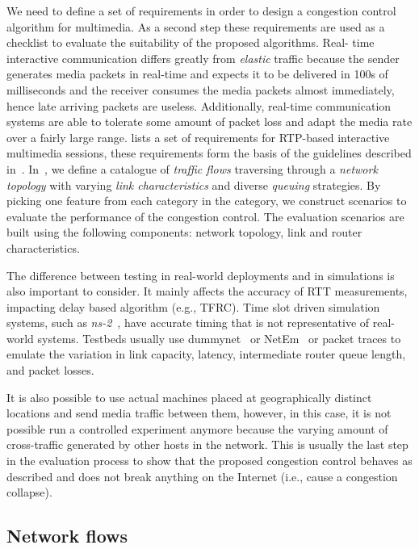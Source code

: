 We need to define a set of requirements in order to design a congestion
control algorithm for multimedia. As a second step these requirements are used
as a checklist to evaluate the suitability of the proposed algorithms. Real-
time interactive communication differs greatly from \emph{elastic} traffic
because the sender generates media packets in real-time and expects it to be
delivered in 100s of milliseconds and the receiver consumes the media packets
almost immediately, hence late arriving packets are useless. Additionally,
real-time communication systems are able to tolerate some amount of packet
loss and adapt the media rate over a fairly large range.
\cite{draft.rmcat.req} lists a set of requirements for RTP-based interactive
multimedia sessions, these requirements form the basis of the guidelines
described in~\cite{draft.rmcat.evaluate}. In~\cite{draft.rmcat.evaluate}, we
define a catalogue of \emph{traffic flows} traversing through a \emph{network
topology} with varying \emph{link characteristics} and diverse \emph{queuing}
strategies. By picking one feature from each category in the category, we
construct scenarios to evaluate the performance of the congestion control. The
evaluation scenarios are built using the following components: network
topology, link and router characteristics.

The difference between testing in real-world deployments and in simulations is
also important to consider. It mainly affects the accuracy of RTT
measurements, impacting delay based algorithm (e.g., TFRC). Time slot driven
simulation systems, such as \emph{ns-2}~\cite{ns2}, have accurate timing that
is not representative of real-world systems. Testbeds usually use
dummynet~\cite{Carbone:2010p3502} or NetEm~\cite{netem} or packet traces to
emulate the variation in link capacity, latency, intermediate router queue
length, and packet losses. 

It is also possible to use actual machines placed at geographically distinct
locations and send media traffic between them, however, in this case, it is
not possible run a controlled experiment anymore because the varying amount of
cross-traffic generated by other hosts in the network. This is usually the
last step in the evaluation process to show that the proposed congestion
control behaves as described and does not break anything on the Internet
(i.e., cause a congestion collapse).

\subsection*{Network flows}

